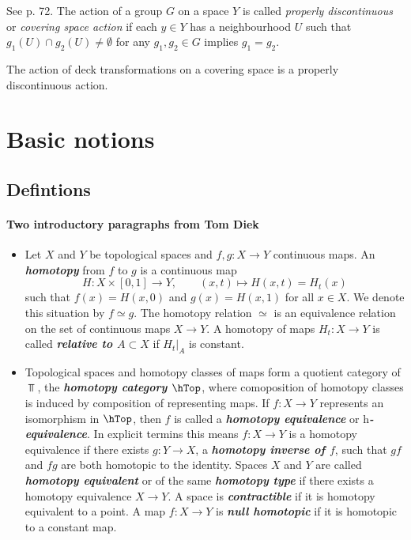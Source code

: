 \begin{definition}
\label{definition-properly-discontinuous-action}
See \cite{hat} p. 72. The action of a group $G$ on a space $Y$ is called 
{\it properly discontinuous} or {\it covering space action} if each $y \in Y$
has a neighbourhood $U$ such that $g_1(U) \cap g_2(U)\neq \emptyset$ for any
$g_1,g_2 \in G$ implies $g_1=g_2$.
\end{definition}

\begin{proposition}
\label{proposition-deck-transformations-act-properly-discontinuous}
The action of deck transformations on a covering space is a properly
discontinuous action.
\end{proposition}

\section{Basic notions}\label{sec:Basic notions}
\subsection{Defintions}
\paragraph{Two introductory paragraphs from Tom Diek}
\begin{itemize}
	\item Let $X$ and $Y$ be topological spaces and $f,g:X\to Y$ continuous maps. An \textbf{\textit{homotopy}} from $f$ to $g$ is a continuous map
		\[H:X\times[0,1]\to Y,\qquad(x,t)\mapsto H(x,t)=H_t(x)\]
		such that $f(x)=H(x,0)$ and $g(x)=H(x,1)$ for all $x\in X$. We denote this situation by $f\simeq g$. The homotopy relation $\simeq$ is an equivalence relation on the set of continuous maps $X\to Y$. A homotopy of maps $H_t:X\to Y$ is called \textbf{\textit{relative to $A\subset X$}} if $H_t|_A$ is constant.
		
		\item Topological spaces and homotopy classes of maps form a quotient category of $\Top$, the \textbf{\textit{homotopy category $\hTop$}}, where comoposition of homotopy classes is induced by composition of representing maps. If $f:X\to Y$ represents an isomorphism in $\hTop$, then $f$ is called a \textbf{\textit{homotopy equivalence}} or \textbf{\textit{$\text{h}$-equivalence}}. In explicit termins this means $f:X\to Y$ is a homotopy equivalence if there exists $g:Y\to X$, a \textbf{\textit{homotopy inverse of $f$}}, such that $gf$ and $fg$ are both homotopic to the identity. Spaces $X$ and $Y$ are called \textbf{\textit{homotopy equivalent}} or of the same \textbf{\textit{homotopy type}} if there exists a homotopy equivalence $X\to Y$. A space is \textbf{\textit{contractible}} if it is homotopy equivalent to a point. A map $f:X\to Y$ is \textbf{\textit{null homotopic}} if it is homotopic to a constant map.
\end{itemize}

